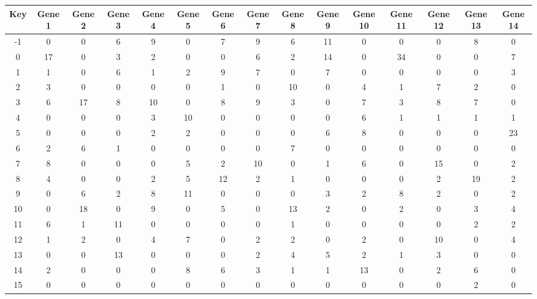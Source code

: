 \begin{tabular}{|c|c|c|c|c|c|c|c|c|c|c|c|c|c|c|}
\hline
Key & Gene 1 & Gene 2 & Gene 3 & Gene 4 & Gene 5 & Gene 6 & Gene 7 & Gene 8 & Gene 9 & Gene 10 & Gene 11 & Gene 12 & Gene 13 & Gene 14 \\
\hline
-1 & 0 & 0 & 6 & 9 & 0 & 7 & 9 & 6 & 11 & 0 & 0 & 0 & 8 & 0 \\
0 & 17 & 0 & 3 & 2 & 0 & 0 & 6 & 2 & 14 & 0 & 34 & 0 & 0 & 7 \\
1 & 1 & 0 & 6 & 1 & 2 & 9 & 7 & 0 & 7 & 0 & 0 & 0 & 0 & 3 \\
2 & 3 & 0 & 0 & 0 & 0 & 1 & 0 & 10 & 0 & 4 & 1 & 7 & 2 & 0 \\
3 & 6 & 17 & 8 & 10 & 0 & 8 & 9 & 3 & 0 & 7 & 3 & 8 & 7 & 0 \\
4 & 0 & 0 & 0 & 3 & 10 & 0 & 0 & 0 & 0 & 6 & 1 & 1 & 1 & 1 \\
5 & 0 & 0 & 0 & 2 & 2 & 0 & 0 & 0 & 6 & 8 & 0 & 0 & 0 & 23 \\
6 & 2 & 6 & 1 & 0 & 0 & 0 & 0 & 7 & 0 & 0 & 0 & 0 & 0 & 0 \\
7 & 8 & 0 & 0 & 0 & 5 & 2 & 10 & 0 & 1 & 6 & 0 & 15 & 0 & 2 \\
8 & 4 & 0 & 0 & 2 & 5 & 12 & 2 & 1 & 0 & 0 & 0 & 2 & 19 & 2 \\
9 & 0 & 6 & 2 & 8 & 11 & 0 & 0 & 0 & 3 & 2 & 8 & 2 & 0 & 2 \\
10 & 0 & 18 & 0 & 9 & 0 & 5 & 0 & 13 & 2 & 0 & 2 & 0 & 3 & 4 \\
11 & 6 & 1 & 11 & 0 & 0 & 0 & 0 & 1 & 0 & 0 & 0 & 0 & 2 & 2 \\
12 & 1 & 2 & 0 & 4 & 7 & 0 & 2 & 2 & 0 & 2 & 0 & 10 & 0 & 4 \\
13 & 0 & 0 & 13 & 0 & 0 & 0 & 2 & 4 & 5 & 2 & 1 & 3 & 0 & 0 \\
14 & 2 & 0 & 0 & 0 & 8 & 6 & 3 & 1 & 1 & 13 & 0 & 2 & 6 & 0 \\
15 & 0 & 0 & 0 & 0 & 0 & 0 & 0 & 0 & 0 & 0 & 0 & 0 & 2 & 0 \\
\hline
\end{tabular}